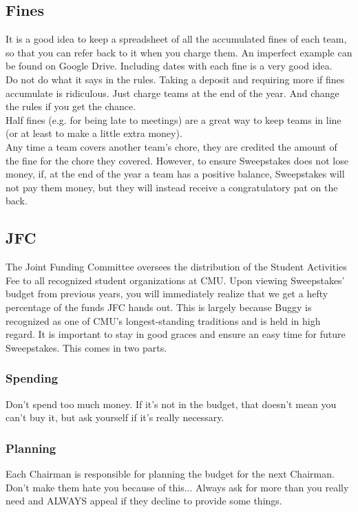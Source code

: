 \subsection{Fines}
It is a good idea to keep a spreadsheet of all the accumulated fines of each
team, so that you can refer back to it when you charge them. An imperfect
example can be found on Google Drive. Including dates with each fine is
a very good idea.
\\
Do not do what it says in the rules. Taking a deposit and requiring more if
fines accumulate is ridiculous. Just charge teams at the end of the year.
And change the rules if you get the chance.
\\
Half fines (e.g. for being late to meetings) are a great way to keep teams in
line (or at least to make a little extra money).
\\
Any time a team covers another team's chore, they are credited the amount
of the fine for the chore they covered. However, to ensure Sweepstakes does
not lose money, if, at the end of the year a team has a positive balance,
Sweepstakes will not pay them money, but they will instead receive a
congratulatory pat on the back.

\subsection{JFC}
The Joint Funding Committee oversees the distribution of the Student
Activities Fee to all recognized student organizations at CMU. Upon
viewing Sweepstakes' budget from previous years, you will immediately
realize that we get a hefty percentage of the funds JFC hands out. This
is largely because Buggy is recognized as one of CMU's longest-standing
traditions and is held in high regard. It is important to stay in good
graces and ensure an easy time for future Sweepstakes. This comes in two
parts.
\subsubsection{Spending}
Don't spend too much money. If it's not in the budget, that doesn't mean
you can't buy it, but ask yourself if it's really necessary.

\subsubsection{Planning}
Each Chairman is responsible for planning the budget for the next Chairman.
Don't make them hate you because of this... Always ask for more than you
really need and ALWAYS appeal if they decline to provide some things.


